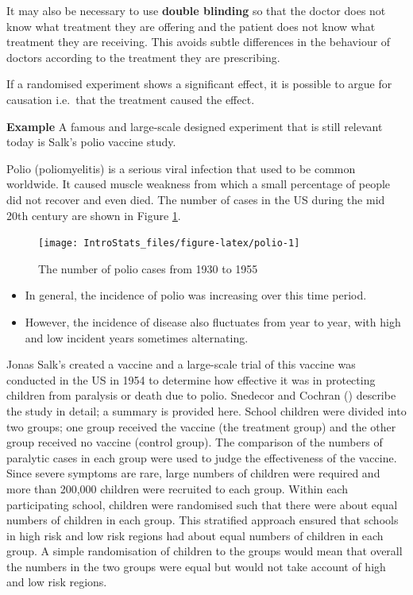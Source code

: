 \documentclass[
  oneside]{krantz}
\providecommand{\tightlist}{%
  \setlength{\itemsep}{0pt}\setlength{\parskip}{0pt}}
\begin{document}
It may also be necessary to use \textbf{double blinding} so that the doctor does not know what treatment they are offering and the patient does not know what treatment they are receiving. This avoids subtle differences in the behaviour of doctors according to the treatment they are prescribing.

If a randomised experiment shows a significant effect, it is possible to argue for causation i.e.~that the treatment caused the effect.

\textbf{Example} A famous and large-scale designed experiment that is still relevant today is Salk's polio vaccine study.

Polio (poliomyelitis) is a serious viral infection that used to be common worldwide. It caused muscle weakness from which a small percentage of people did not recover and even died. The number of cases in the US during the mid 20th century are shown in Figure \ref{fig:polio}.

\begin{figure}[!htbp]

{\centering \texttt{[image: IntroStats\_files/figure-latex/polio-1]} 

}

\caption{The number of polio cases from 1930 to 1955}\label{fig:polio}
\end{figure}

\begin{itemize}
\tightlist
\item
  In general, the incidence of polio was increasing over this time period.
\item
  However, the incidence of disease also fluctuates from year to year, with high and low incident years sometimes alternating.
\end{itemize}

Jonas Salk's created a vaccine and a large-scale trial of this vaccine was conducted in the US in 1954 to determine how effective it was in protecting children from paralysis or death due to polio. Snedecor and Cochran (\citeyearpar{Snedecor&Cochran1980}) describe the study in detail; a summary is provided here. School children were divided into two groups; one group received the vaccine (the treatment group) and the other group received no vaccine (control group). The comparison of the numbers of paralytic cases in each group were used to judge the effectiveness of the vaccine. Since severe symptoms are rare, large numbers of children were required and more than 200,000 children were recruited to each group. Within each participating school, children were randomised such that there were about equal numbers of children in each group. This stratified approach ensured that schools in high risk and low risk regions had about equal numbers of children in each group. A simple randomisation of children to the groups would mean that overall the numbers in the two groups were equal but would not take account of high and low risk regions.
\end{document}
